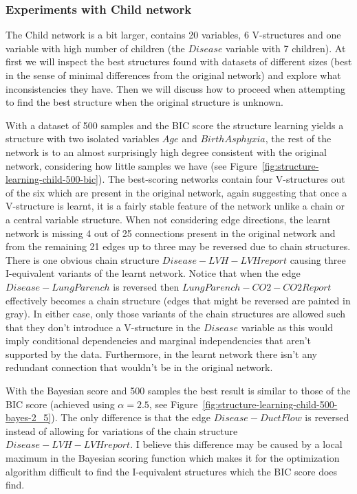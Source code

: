 \documentclass[english,cover]{fitthesis} %
\begin{document}
\subsubsection{Experiments with Child network}
The Child network is a bit larger, contains 20 variables, 6 V-structures and one variable with high number of children (the $Disease$ variable with 7 children). At first we will inspect the best structures found with datasets of different sizes (best in the sense of minimal differences from the original network) and explore what inconsistencies they have. Then we will discuss how to proceed when attempting to find the best structure when the original structure is unknown.

With a dataset of 500 samples and the BIC score the structure learning yields a structure with two isolated variables $Age$ and $BirthAsphyxia$, the rest of the network is to an almost surprisingly high degree consistent with the original network, considering how little samples we have (see Figure~\ref{fig:structure-learning-child-500-bic}). The best-scoring networks contain four V-structures out of the six which are present in the original network, again suggesting that once a V-structure is learnt, it is a fairly stable feature of the network unlike a chain or a central variable structure. When not considering edge directions, the learnt network is missing 4 out of 25 connections present in the original network and from the remaining 21 edges up to three may be reversed due to chain structures. There is one obvious chain structure $Disease - LVH - LVHreport$ causing three I-equivalent variants of the learnt network. Notice that when the edge $Disease - LungParench$ is reversed then $LungParench - CO2 - CO2Report$ effectively becomes a chain structure (edges that might be reversed are painted in gray). In either case, only those variants of the chain structures are allowed such that they don't introduce a V-structure in the $Disease$ variable as this would imply conditional dependencies and marginal independencies that aren't supported by the data. Furthermore, in the learnt network there isn't any redundant connection that wouldn't be in the original network.

With the Bayesian score and 500 samples the best result is similar to those of the BIC score (achieved using $\alpha=2.5$, see Figure~\ref{fig:structure-learning-child-500-bayes-2_5}). The only difference is that the edge $Disease - DuctFlow$ is reversed instead of allowing for variations of the chain structure $Disease - LVH - LVHreport$. I believe this difference may be caused by a local maximum in the Bayesian scoring function which makes it for the optimization algorithm difficult to find the I-equivalent structures which the BIC score does find.
\end{document}

